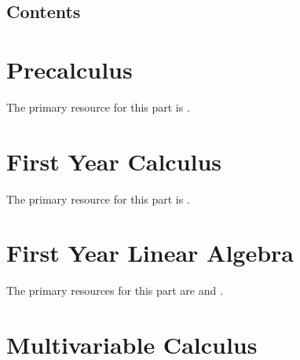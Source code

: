 \documentclass[10pt,twoside=false,open=any,numbers=noenddot]{scrbook}
\begin{document}


\newpage

\frontmatter

\setcounter{tocdepth}{0}
\noptcrule
\chapter*{Contents}
\renewcommand{\contentsname}{\vspace{-3em}}
\tableofcontents




\mainmatter


\part{Precalculus}
\label{part: Precalculus}
\vspace*{2em} The primary resource for this part is \cite{ref:axler_precalc}.  \vspace*{1em}
\parttoc


\part{First Year Calculus}
\label{part: First Year Calculus}
\vspace*{2em} The primary resource for this part is \cite{ref:stewart}. \vspace*{1em}
\parttoc


\part{First Year Linear Algebra}
\label{part: First Year Linear}
\vspace*{2em} The primary resources for this part are \cite{ref:strang_laaa} and \cite{ref:strang_itla}. \vspace*{1em}
\parttoc


\part{Multivariable Calculus}
\label{part: Multivariable Calculus}
\parttoc

\end{document}
